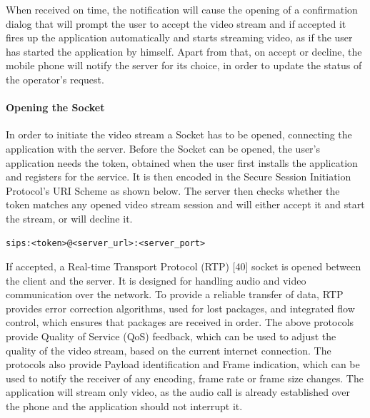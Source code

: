 \documentclass{article}
\begin{document}
When received on time, the notification will cause the opening of a confirmation dialog that will prompt the user to accept the video stream and if accepted it fires up the application automatically and starts streaming video, as if the user has started the application by himself. Apart from that, on accept or decline, the mobile phone will notify the server for its choice, in order to update the status of the operator’s request.

\pagebreak
\paragraph{Opening the Socket}
In order to initiate the video stream a Socket has to be opened, connecting the application with the server. Before the Socket can be opened, the user’s application needs the token, obtained when the user first installs the application and registers for the service. It is then encoded in the Secure Session Initiation Protocol’s URI Scheme as shown below. The server then checks whether the token matches any opened video stream session and will either accept it and start the stream, or will decline it.
\begin{lstlisting}
sips:<token>@<server_url>:<server_port>
\end{lstlisting}
If accepted, a Real-time Transport Protocol (RTP) [40] socket is opened between the client and the server. It is designed for handling audio and video communication over the network. To provide a reliable transfer of data, RTP provides error correction algorithms, used for lost packages, and integrated flow control, which ensures that packages are received in order. The above protocols provide Quality of Service (QoS) feedback, which can be used to adjust the quality of the video stream, based on the current internet connection. The protocols also provide Payload identification and Frame indication, which can be used to notify the receiver of any encoding, frame rate or frame size changes. The application will stream only video, as the audio call is already established over the phone and the application should not interrupt it.\\
\end{document}
